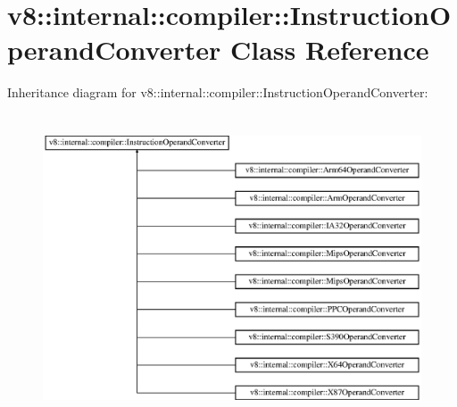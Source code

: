 \hypertarget{classv8_1_1internal_1_1compiler_1_1_instruction_operand_converter}{}\section{v8\+:\+:internal\+:\+:compiler\+:\+:Instruction\+Operand\+Converter Class Reference}
\label{classv8_1_1internal_1_1compiler_1_1_instruction_operand_converter}
Inheritance diagram for v8\+:\+:internal\+:\+:compiler\+:\+:Instruction\+Operand\+Converter\+:\begin{figure}[H]
\begin{center}
\leavevmode
\includegraphics[height=9.120521cm]{classv8_1_1internal_1_1compiler_1_1_instruction_operand_converter}
\end{center}
\end{figure}
